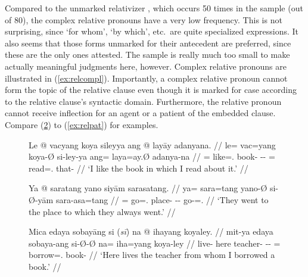Compared to the unmarked relativizer , which occurs 50 times in
the sample (out of 80), the complex relative pronouns have a very low
frequency. This is not surprising, since `for whom', `by which', etc.\ are
quite specialized expressions. It also seems that those forms unmarked for
their antecedent are preferred, since these are the only ones attested. The
sample is really much too small to make actually meaningful judgments here,
however. Complex relative pronouns are illustrated in (\ref{ex:relcompl}).
Importantly, a complex relative pronoun cannot form the topic of the relative
clause even though it is marked for case according to the relative clause's
syntactic domain. Furthermore, the relative pronoun cannot receive inflection
for an agent or a patient of the embedded clause. Compare (\ref{ex:reltop}) to
(\ref{ex:relpat}) for examples.

\begin{figure}
\pex\label{ex:relcompl}
\a\begingl[glspace=.33em]
	\gla Le @ vacyang koya sileyya ang @ layāy adanyana. //
	\glb le= vac=yang koya-Ø si-ley-ya ang= laya=ay.Ø adanya-na //
	\glc \PatTI{}= like=\Fsg{}.\Aarg{} book-\Top{} \Rel{}-\PargI{}-\Loc{}
	\AgtT{}= read=\Fsg{}.\Top{} that-\Gen{} //
	\glft `I like the book in which I read about it.' //
\endgl

\a\label{ex:reldat}\begingl
	\gla Ya @ saratang yano siyām sarasatang. //
	\glb ya= sara=tang yano-Ø si-Ø-yām sara-asa=tang //
	\glc \LocT{}= go=\TplM{}.\Aarg{} place-\Top{} \Rel{}-\Loc{}-\Dat{} 
		go-\Hab{}=\TplM{}.\Aarg{} //
	\glft `They went to the place to which they always went.' //
\endgl
\xe
\end{figure}

\begin{figure}
\ex\label{ex:reltop}
\ljudge* \begingl
	\gla Mica edaya sobayāng {si \textup{(\ques{}\textit{sī})}} na @ ihayang 
		koyaley. //
	\glb mit-ya edaya sobaya-ang si-Ø-Ø na= iha=yang koya-ley //
	\glc live-\TsgM{} here teacher-\Aarg{} \Rel{}-\Aarg{}-\Top{} \GenT{}= 
		borrow=\Fsg{}.\Aarg{} book-\PargI{} //
% 
	\glft `Here lives the teacher from whom I borrowed a book.' //
\endgl
\xe
\end{figure}

